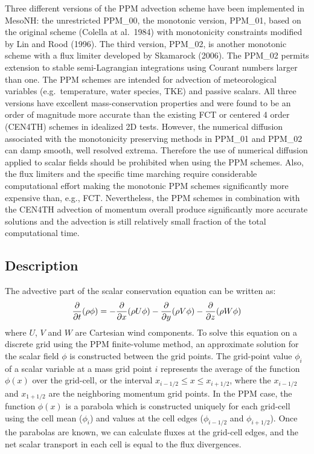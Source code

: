   Three different versions of the PPM advection scheme have been
  implemented in MesoNH: the unrestricted PPM\_00, the monotonic
  version, PPM\_01, based on the original scheme (Colella at al.\ 1984)
  with monotonicity constraints modified by Lin and Rood (1996). The
  third version, PPM\_02, is another monotonic scheme with a flux
  limiter developed by Skamarock (2006). The PPM\_02 permits extension
  to stable semi-Lagrangian integrations using Courant numbers larger
  than one. The PPM schemes are intended for advection of meteorological
  variables (e.g.\ temperature, water species, TKE) and passive
  scalars. All three versions have excellent mass-conservation properties
  and were found to be an order of magnitude more accurate than the
  existing FCT or centered 4 order (CEN4TH) schemes in idealized
  2D tests. However, the numerical diffusion associated with the
  monotonicity preserving methods in PPM\_01 and PPM\_02 can damp
  smooth, well resolved extrema. Therefore the use of numerical diffusion
  applied to scalar fields should be prohibited when using the PPM schemes.
  Also, the flux limiters and the
  specific time marching require considerable computational effort
  making the monotonic PPM schemes significantly more expensive than,
  e.g., FCT. Nevertheless, the PPM schemes in combination with the
  CEN4TH advection of momentum overall produce significantly more
  accurate solutions and the advection is still relatively small
  fraction of the total computational time.

  \subsection{Description}

  The advective part of the scalar conservation equation can be written
  as:  
  \begin{equation}
    \label{advection}
    \frac{\partial}{\partial t}(\rho \phi) =
    - \frac{\partial}{\partial x}(\rho U \phi)
    - \frac{\partial}{\partial y}(\rho V \phi)
    - \frac{\partial}{\partial z}(\rho W \phi)    
  \end{equation}
  where $U$, $V$ and $W$ are Cartesian wind components. To solve this
  equation on a discrete grid using the PPM finite-volume method, an
  approximate solution for the scalar field $\phi$ is constructed
  between the grid points. The grid-point value $\phi_{i}$ of a scalar
  variable at a mass grid point $i$ represents the average of the
  function $\phi(x)$ over the grid-cell, or the interval $x_{i-1/2} \le
  x \le x_{i+1/2}$, where the $x_{i-1/2}$ and $x_{1+1/2}$ are the
  neighboring momentum grid points. In the PPM case, the function
  $\phi(x)$ is a parabola which is constructed uniquely for each
  grid-cell using the cell mean ($\phi_{i}$) and values at the cell
  edges ($\phi_{i-1/2}$ and $\phi_{i+1/2}$).  Once the parabolas are
  known, we can calculate fluxes at the grid-cell edges, and the net
  scalar transport in each cell is equal to the flux divergences.

